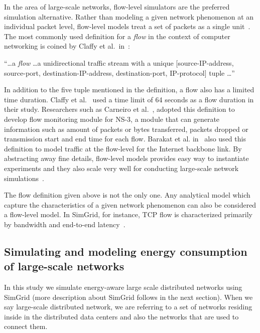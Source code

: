 In the area of large-scale networks, flow-level simulators are the preferred simulation alternative. Rather than modeling a given network phenomenon at an individual packet level, flow-level models treat a set of packets as a single unit~\cite{DBLP:journals/jpdc/CasanovaGLQS14,DBLP:conf/infocom/LiuFGKT01}. The most commonly used definition for a \emph{flow} in the context of computer networking is coined by Claffy et al.~in~\cite{claffy1998nature}: 

``\ldots a \emph{flow} \ldots a unidirectional traffic stream with a unique [source-IP-address, source-port, destination-IP-address, destination-port, IP-protocol] tuple \ldots''

In addition to the five tuple mentioned in the definition, a flow also has a limited time duration. Claffy et al.~\cite{claffy1998nature} used a time limit of 64 seconds as a flow duration in their study. Researchers such as Carneiro et al.~\cite{DBLP:conf/valuetools/CarneiroFR09}, adopted this definition to develop flow monitoring module for NS-3, a module that can generate information such as amount of packets or bytes transferred, packets dropped or transmission start and end time for each flow. Barakat et al. in~\cite{DBLP:journals/tsp/BarakatTIDO03} also used this definition to model traffic at the flow-level for the Internet backbone link. By abstracting away fine details, flow-level models provides easy way to instantiate experiments and they also scale very well for conducting large-scale network simulations~\cite{DBLP:journals/jpdc/CasanovaGLQS14,DBLP:journals/tsp/BarakatTIDO03}.

The flow definition given above is not the only one. Any analytical model which capture the characteristics of a given network phenomenon can also be considered a flow-level model. In SimGrid, for instance, TCP flow is characterized primarily by bandwidth and end-to-end latency~\cite{DBLP:journals/jpdc/CasanovaGLQS14}.
\subsection{Simulating and modeling energy consumption of large-scale networks}

In this study we simulate energy-aware large scale distributed networks using SimGrid (more description about SimGrid follows in the next section). When we say large-scale distributed network, we are referring to a set of networks residing inside in the distributed data centers and also the networks that are used to connect them. 

